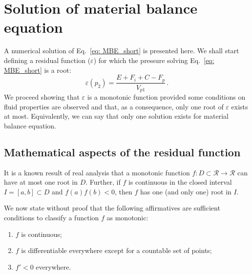 \documentclass[final,authoryear,5p,times,twocolumn,10pt]{elsarticle}
\begin{document}
\section{Solution of material balance equation}
A numerical solution of Eq.~\eqref{eq: MBE_short} is presented here. We shall start defining a residual function ($\varepsilon$) for which the pressure solving Eq.~\eqref{eq: MBE_short} is a root:
\begin{equation}\label{eq: residual}
\varepsilon(p_2) = \frac{E+F_i+C-F_p}{V_{p1}} \, .
\end{equation}
We proceed showing that $\varepsilon$ is a monotonic function provided some conditions on fluid properties are observed and that, as a consequence, only one root of $\varepsilon$ exists at most. Equivalently, we can say that only one solution exists for material balance equation.


\subsection{Mathematical aspects of the residual function}

It is a known result of real analysis that a monotonic function $f:D\subset\mathcal{R}\rightarrow\mathcal{R}$ can have at most one root in $D$. Further, if $f$ is continuous in the closed interval $I=[a,b] \subset D$ and $f(a)f(b)<0$, then $f$ has one (and only one) root in $I$.

We now state without proof that the following affirmatives are sufficient conditions to classify a function $f$ as monotonic:
\begin{enumerate}
\item $f$ is continuous;
\item $f$ is differentiable everywhere except for a countable set of points;
\item $f'<0$ everywhere.
\end{enumerate}
\end{document}
